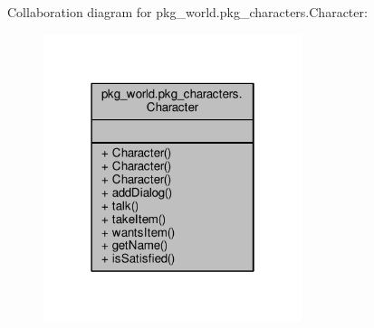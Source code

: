 Collaboration diagram for pkg\-\_\-world.\-pkg\-\_\-characters.\-Character\-:
\nopagebreak
\begin{figure}[H]
\begin{center}
\leavevmode
\includegraphics[width=214pt]{classpkg__world_1_1pkg__characters_1_1Character__coll__graph}
\end{center}
\end{figure}

